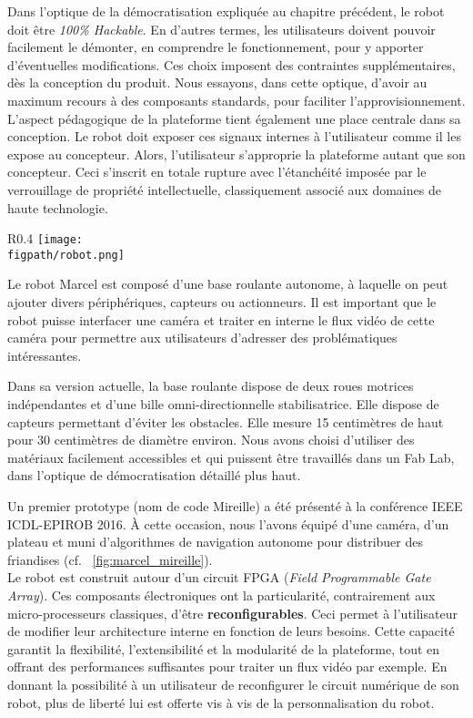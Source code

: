 \documentclass[a4paper,12pt]{report}
\newcommand{\figpath}{figures}
\begin{document}
Dans l'optique de la démocratisation expliquée au chapitre précédent, le robot doit être \emph{100\% Hackable}.
En d'autres termes, les utilisateurs doivent pouvoir facilement le démonter, en comprendre le fonctionnement, pour y apporter d'éventuelles modifications.
Ces choix imposent des contraintes supplémentaires, dès la conception du produit.
Nous essayons, dans cette optique, d'avoir au maximum recours à des composants standards, pour faciliter l'approvisionnement.
L'aspect pédagogique de la plateforme tient également une place centrale dans sa conception.
Le robot doit exposer ces signaux internes à l'utilisateur comme il les expose au concepteur. Alors, l'utilisateur s'approprie la plateforme autant que son concepteur.
Ceci s'inscrit en totale rupture avec l'étanchéité imposée par le verrouillage de propriété intellectuelle, classiquement associé aux domaines de haute technologie.\\

\begin{wrapfigure}{R}{0.4\textwidth}
	\centering
	\texttt{[image: \\figpath/robot.png]}
	\caption{\label{fig:marcel_mireille}Base roulante Marcel : Prototype \og{}Mireille\fg{}.}
\end{wrapfigure}

Le robot Marcel est composé d'une base roulante autonome, à laquelle on peut ajouter divers périphériques, capteurs ou actionneurs.
Il est important que le robot puisse interfacer une caméra et traiter en interne le flux vidéo de cette caméra pour permettre aux utilisateurs d'adresser des problématiques intéressantes.

Dans sa version actuelle, la base roulante dispose de deux roues motrices indépendantes et d'une bille omni-directionnelle stabilisatrice.
Elle dispose de capteurs permettant d'éviter les obstacles.
Elle mesure 15 centimètres de haut pour 30 centimètres de diamètre environ.
Nous avons choisi d'utiliser des matériaux facilement accessibles et qui puissent être travaillés dans un Fab Lab, dans l'optique de démocratisation détaillé plus haut.

Un premier prototype (nom de code \og{}Mireille\fg{}) a été présenté à la conférence IEEE ICDL-EPIROB 2016.
À cette occasion, nous l'avons équipé d'une caméra, d'un plateau et muni d'algorithmes de navigation autonome pour distribuer des friandises (cf. \figurename~\ref{fig:marcel_mireille}).\\

Le robot est construit autour d'un circuit FPGA (\emph{Field Programmable Gate Array}).
Ces composants électroniques ont la particularité, contrairement aux micro-processeurs \og{}classiques\fg{}, d'être \textbf{reconfigurables}. 
Ceci permet à l'utilisateur de modifier leur architecture interne en fonction de leurs besoins.
Cette capacité garantit la flexibilité, l'extensibilité et la modularité de la plateforme, tout en offrant des performances suffisantes pour traiter un flux vidéo par exemple.
En donnant la possibilité à un utilisateur de reconfigurer le circuit numérique de son robot, plus de liberté lui est offerte vis à vis de la personnalisation du robot.
\end{document}
